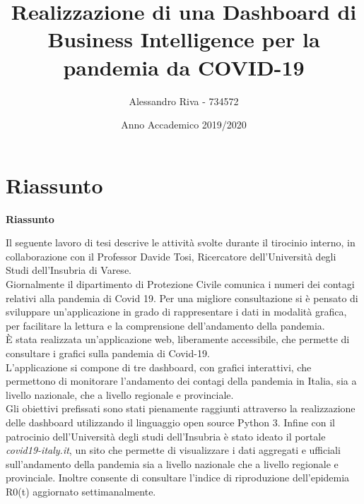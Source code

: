 \documentclass[a4paper,12pt]{article}
\title{Realizzazione di una Dashboard di Business Intelligence per la pandemia da COVID-19}
\author{Alessandro Riva - 734572}
\date{Anno Accademico 2019/2020}
\makeatletter
\renewenvironment{abstract}{%
    \if@twocolumn
      \section*{\abstractname}%
    \else
      \begin{center}%
        {\bfseries \Large\abstractname\vspace{\z@}}
      \end{center}%
      \quotation
    \fi}
    {\if@twocolumn\else\endquotation\fi}
\makeatother
\begin{document}
\renewcommand{\abstractname}{Riassunto}
\maketitle
\begin{abstract}
    \noindent Il seguente lavoro di tesi descrive le attività svolte durante il tirocinio interno, in collaborazione con il Professor Davide Tosi, Ricercatore dell’Università degli Studi dell’Insubria di Varese.\\
    Giornalmente il dipartimento di Protezione Civile comunica i numeri dei contagi relativi alla pandemia di Covid 19.
    Per una migliore consultazione si è pensato di sviluppare un’applicazione in grado di rappresentare i dati in modalità grafica, per facilitare la lettura e la comprensione dell’andamento della pandemia.\\
    È stata realizzata un’applicazione web, liberamente accessibile, che permette di consultare i grafici sulla pandemia di Covid-19.\\
    L’applicazione si compone di tre dashboard, con grafici interattivi, che permettono di monitorare l’andamento dei contagi della pandemia in Italia, sia a livello nazionale, che a livello regionale e provinciale.\\
    Gli obiettivi prefissati sono stati pienamente raggiunti attraverso la realizzazione delle dashboard utilizzando il linguaggio open source Python 3.
    Infine con il patrocinio dell’Università degli studi dell’Insubria è stato ideato il portale \emph{covid19-italy.it}, un sito che permette di visualizzare i dati aggregati e ufficiali sull’andamento della pandemia sia a livello nazionale che a livello regionale e provinciale. Inoltre consente di consultare l'indice di riproduzione dell'epidemia R0(t) aggiornato settimanalmente.
\end{abstract}
\end{document}
